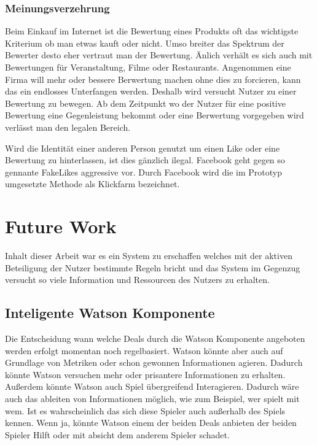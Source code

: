 \documentclass[german]{cgspaper} %
\begin{document}
\subsubsection{Meinungsverzehrung}

Beim Einkauf im Internet ist die Bewertung eines Produkts oft das wichtigste Kriterium ob man etwas kauft oder nicht.
Umso breiter das Spektrum der Bewerter desto eher vertraut man der Bewertung.
Änlich verhält es sich auch mit Bewertungen für Veranstaltung, Filme oder Restaurants.
Angenommen eine Firma will mehr oder bessere Berwertung machen ohne dies zu forcieren, kann das ein endlosses Unterfangen werden.
Deshalb wird versucht Nutzer zu einer Bewertung zu bewegen.
Ab dem Zeitpunkt wo der Nutzer für eine positive Bewertung eine Gegenleistung bekommt oder eine Berwertung vorgegeben wird verlässt man den legalen Bereich.

Wird die Identität einer anderen Person genutzt um einen Like oder eine Bewertung zu hinterlassen, ist dies gänzlich ilegal.
Facebook geht gegen so gennante FakeLikes aggressive vor.
Durch Facebook wird die im Prototyp umgesetzte Methode als Klickfarm bezeichnet. \cite{FakeLikes2018}

\section{Future Work}\label{sec:future}

Inhalt dieser Arbeit war es ein System zu erschaffen welches mit der aktiven Beteiligung der Nutzer bestimmte Regeln bricht und das System im Gegenzug versucht so viele Information und Ressourcen des Nutzers zu erhalten.

\subsection{Inteligente Watson Komponente}

Die Entscheidung wann welche Deals durch die Watson Komponente angeboten werden erfolgt momentan noch regelbasiert.
Watson könnte aber auch auf Grundlage von Metriken oder schon gewonnen Informationen agieren.
Dadurch könnte Watson versuchen mehr oder prisantere Informationen zu erhalten.
Außerdem könnte Watson auch Spiel übergreifend Interagieren.
Dadurch wäre auch das ableiten von Informationen möglich, wie zum Beispiel, wer spielt mit wem.
Ist es wahrscheinlich das sich diese Spieler auch außerhalb des Spiels kennen.
Wenn ja, könnte Watson einem der beiden Deals anbieten der beiden Spieler Hilft oder mit absicht dem anderem Spieler schadet.
\end{document}

